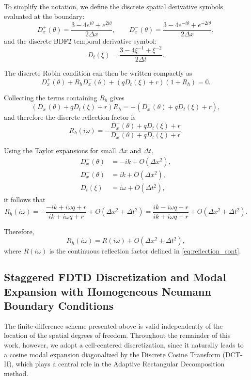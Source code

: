 \documentclass{Configuration_Files/PoliMi3i_thesis}
\begin{document}
To simplify the notation, we define the discrete spatial derivative symbols evaluated at the boundary:
\begin{equation*}
D_x^+(\theta) = \frac{3 - 4e^{i\theta} + e^{2i\theta}}{2\Delta x},
\qquad
D_x^-(\theta) = \frac{3 - 4e^{-i\theta} + e^{-2i\theta}}{2\Delta x},
\end{equation*}
and the discrete BDF2 temporal derivative symbol:
\begin{equation*}
D_t(\xi) = \frac{3 - 4\xi^{-1} + \xi^{-2}}{2\Delta t}.
\end{equation*}

The discrete Robin condition can then be written compactly as
\begin{equation*}
D_x^+(\theta) + R_h D_x^-(\theta)
+
\left(q D_t(\xi) + r\right)(1+R_h)
=
0.
\end{equation*}

Collecting the terms containing $R_h$ gives
\begin{equation*}
\left( D_x^-(\theta) + q D_t(\xi) + r \right) R_h
=
- \left( D_x^+(\theta) + q D_t(\xi) + r \right),
\end{equation*}
and therefore the discrete reflection factor is
\begin{equation*}
R_h(i\omega)
=
- \frac{D_x^+(\theta) + q D_t(\xi) + r}{D_x^-(\theta) + q D_t(\xi) + r}.
\end{equation*}

Using the Taylor expansions for small $\Delta x$ and $\Delta t$,
\begin{align*}
D_x^+(\theta) &= -ik + O(\Delta x^2), \\
D_x^-(\theta) &= ik + O(\Delta x^2), \\
D_t(\xi) &= i\omega + O(\Delta t^2),
\end{align*}
it follows that
\begin{equation*}
R_h(i\omega)
=
- \frac{-ik + i\omega q + r}{ik + i\omega q + r} + O(\Delta x^2 + \Delta t^2)
=
\frac{ik - i\omega q - r}{ik + i\omega q + r} + O(\Delta x^2 + \Delta t^2).
\end{equation*}

Therefore,
\begin{equation*}
R_h(i\omega)
=
R(i\omega)
+
O(\Delta x^2+\Delta t^2),
\end{equation*}
where \(R(i\omega)\) is the continuous reflection factor defined in \eqref{eq:reflection_cont}.

\subsection{Staggered FDTD Discretization and Modal Expansion with Homogeneous Neumann Boundary Conditions}
The finite-difference scheme presented above is valid independently of the location of the spatial degrees of freedom. Throughout the remainder of this work, however, we adopt a cell-centered discretization, since it naturally leads to a cosine modal expansion diagonalized by the Discrete Cosine Transform (DCT-II), which plays a central role in the Adaptive Rectangular Decomposition method.
\end{document}
